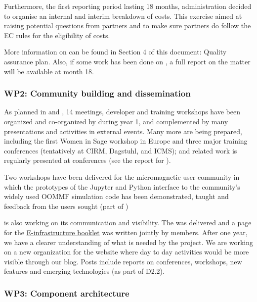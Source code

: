\documentclass{deliverablereport}
\begin{document}
Furthermore, the first reporting period lasting 18 months,  administration decided to organise an internal and interim
breakdown of costs. This exercise aimed at raising potential questions from partners and to make sure partners do follow
the EC rules for the eligibility of costs.

More information on  can be found in Section 4 of this document:
 Quality assurance plan.
Also, if some work has been done on , a full report on the matter will
 be available at month 18.



\subsubsection{WP2: Community building and dissemination}

As planned in  and
, 14 meetings, developer and training
workshops have been organized and co-organized by \ODK during year 1,
and complemented by many presentations and activities in external events.
Many more are being prepared, including the first Women in Sage
workshop in Europe and three major training conferences (tentatively
at CIRM, Dagstuhl, and ICMS); \ODK and \ODK related work is regularly
presented at conferences (see the report for
).

Two workshops have been delivered for the micromagnetic user community
in which the prototypes of the Jupyter and Python interface to the
community's widely used OOMMF simulation code has been demonstrated,
taught and feedback from the users sought
(part of
)

\ODK is also working on its communication and visibility. The 
 was delivered and a page for the \href{https://github.com/OpenDreamKit/OpenDreamKit/blob/master/Communication/eInfra-Booklet/ODK.md}{E-infrastructure booklet} was written
jointly by \ODK members. After
one year, we have a clearer understanding of what is needed by the project.
We are working on a new organization for the website where day to day activities
would be more visible through our blog. Posts include reports on conferences, workshops,
new features and emerging technologies (as part of D2.2).


\subsubsection{WP3: Component architecture}
\end{document}
